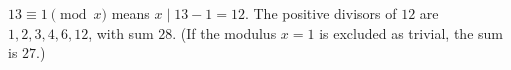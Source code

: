 $13\equiv1\pmod x$ means $x\mid13-1=12$. The positive divisors of $12$ are $1,2,3,4,6,12$, with sum $\boxed{28}$. (If the modulus $x=1$ is excluded as trivial, the sum is $27$.)
